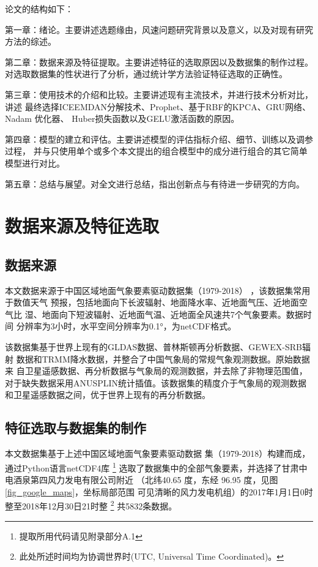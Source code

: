 \documentclass[AutoFakeBold]{LZUThesis}
\begin{document}
论文的结构如下：

第一章：绪论。主要讲述选题缘由，风速问题研究背景以及意义，以及对现有研究
方法的综述。

第二章：数据来源及特征提取。主要讲述特征的选取原因以及数据集的制作过程。
对选取数据集的性状进行了分析，通过统计学方法验证特征选取的正确性。

第三章：使用技术的介绍和比较。主要讲述现有主流技术，并进行技术分析对比，讲述
最终选择ICEEMDAN分解技术、Prophet、基于RBF的KPCA、GRU网络、Nadam 优化器、
Huber损失函数以及GELU激活函数的原因。

第四章：模型的建立和评估。主要讲述模型的评估指标介绍、细节、训练以及调参过程，
并与只使用单个或多个本文提出的组合模型中的成分进行组合的其它简单模型进行对比。

第五章：总结与展望。对全文进行总结，指出创新点与有待进一步研究的方向。




\chapter{数据来源及特征选取}
\section{数据来源}
本文数据来源于中国区域地面气象要素驱动数据集（1979-2018）
，该数据集常用于数值天气
预报，包括地面向下长波辐射、地面降水率、近地面气压、近地面空气比
湿、地面向下短波辐射、近地面气温、近地面全风速共7个气象要素。数据时间
分辨率为3小时，水平空间分辨率为0.1°，为netCDF格式。

该数据集基于世界上现有的GLDAS数据、普林斯顿再分析数据、GEWEX-SRB辐射
数据和TRMM降水数据，并整合了中国气象局的常规气象观测数据。原始数据来
自卫星遥感数据、再分析数据与气象局的观测数据，并去除了非物理范围值，
对于缺失数据采用ANUSPLIN统计插值。该数据集的精度介于气象局的观测数据
和卫星遥感数据之间，优于世界上现有的再分析数据。

\section{特征选取与数据集的制作}
本文数据集基于上述中国区域地面气象要素驱动数据
集（1979-2018）构建而成，通过Python语言netCDF4库
\footnote{提取所用代码请见附录部分A.1}
选取了数据集中的全部气象要素，并选择了甘肃中电酒泉第四风力发电有限公司附近
（北纬40.65 度，东经 96.95 度，见图\ref{fig_google_maps}，坐标局部范围
可见清晰的风力发电机组）的2017年1月1日0时整至2018年12月30日21时整
\footnote{此处所述时间均为协调世界时(UTC, Universal Time Coordinated)。}
共5832条数据。
\end{document}
